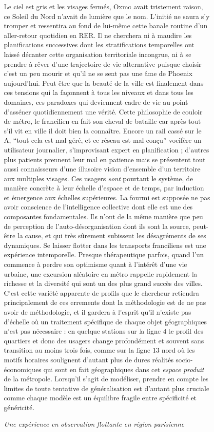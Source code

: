 \begin{figure}[h!]
\begin{mdframed}
Le ciel est gris et les visages fermés, Oxmo avait tristement raison, ce Soleil du Nord n'avait de lumière que le nom. L'initié ne saura s'y tromper et ressentira au fond de lui-même cette banale routine d'un aller-retour quotidien en RER. Il ne cherchera ni à maudire les planifications successives dont les stratifications temporelles ont laissé décanter cette organisation territoriale incongrue, ni à se prendre à rêver d'une trajectoire de vie alternative puisque choisir c'est un peu mourir et qu'il ne se sent pas une âme de Phoenix aujourd'hui. Peut être que la beauté de la ville est finalement dans ces tensions qui la façonnent à tous les niveaux et dans tous les domaines, ces paradoxes qui deviennent cadre de vie au point d'asséner quotidiennement une vérité. Cette philosophie de couloir de métro, le francilien en fait son cheval de bataille car après tout s'il vit en ville il doit bien la connaître. Encore un rail cassé sur le A, ``tout cela est mal géré, et ce réseau est mal conçu'' vocifère un utilisateur journalier, s'improvisant expert en planification ; d'autres plus patients prennent leur mal en patience mais se présentent tout aussi connaisseurs d'une illusoire vision d'ensemble d'un territoire aux multiples visages. Ces usagers \emph{sont} pourtant le système, de manière concrète à leur échelle d'espace et de temps, par induction et émergence aux échelles supérieures. La fourmi est supposée ne pas avoir conscience de l'intelligence collective dont elle est une des composantes fondamentales. Ils n'ont de la même manière que peu de perception de l'auto-désorganisation dont ils sont la source, peut-être la cause, et qui très sûrement subissent les désagréments de ses dynamiques. Se laisser flotter dans les transports franciliens est une expérience intemporelle. Presque thérapeutique parfois, quand l'un commence à perdre son optimisme quant à l'intérêt d'une vie urbaine, une excursion aléatoire en métro rappelle rapidement la richesse et la diversité qui sont un des plus grand succès des villes. C'est cette variété apparente de profils que le chercheur retiendra principalement de ces errements dont la méthodologie est de ne pas avoir de méthodologie, et il gardera à l'esprit qu'il n'existe pas d'échelle où un traitement spécifique de chaque objet géographiques n'est pas nécessaire : en quelque stations sur la ligne 4 le profil des quartiers et donc des usagers change profondément et souvent sans transition au moins trois fois, comme sur la ligne 13 nord où les motifs horaires soulignent d'autant plus de dures réalités socio-économiques qui sont en fait géographiques dans cet \emph{espace produit} de la métropole. Lorsqu'il s'agit de modéliser, prendre en compte les limites de toute tentative de généralisation est d'autant plus cruciale comme chaque modèle est un équilibre fragile entre spécificité et généricité.

\medskip

 \textit{Une expérience en observation flottante en région parisienne}
\end{mdframed}
\end{figure}


